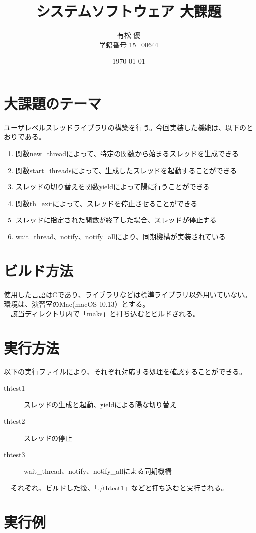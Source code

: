 \documentclass[11pt,a4paper]{jsarticle}
\title{システムソフトウェア 大課題}
\author{有松 優 \\ 学籍番号 15\_00644}
\date{\today}
\begin{document}
\maketitle
%
\hrulefill
\section{大課題のテーマ}
ユーザレベルスレッドライブラリの構築を行う。今回実装した機能は、以下のとおりである。
\begin{enumerate}
	\item 関数new\_threadによって、特定の関数から始まるスレッドを生成できる
	\item 関数start\_threadsによって、生成したスレッドを起動することができる
	\item スレッドの切り替えを関数yieldによって陽に行うことができる
	\item 関数th\_exitによって、スレッドを停止させることができる
	\item スレッドに指定された関数が終了した場合、スレッドが停止する
	\item wait\_thread、notify、notify\_allにより、同期機構が実装されている
\end{enumerate}


\section{ビルド方法}
使用した言語はCであり、ライブラリなどは標準ライブラリ以外用いていない。環境は、演習室のMac(macOS 10.13）とする。\\
　該当ディレクトリ内で「make」と打ち込むとビルドされる。

\section{実行方法}
以下の実行ファイルにより、それぞれ対応する処理を確認することができる。
\begin{description}
 \item[thtest1]スレッドの生成と起動、yieldによる陽な切り替え
 \item[thtest2]スレッドの停止
 \item[thtest3]wait\_thread、notify、notify\_allによる同期機構
\end{description}
　それぞれ、ビルドした後、「./thtest1」などと打ち込むと実行される。

\section{実行例}
\end{document}
